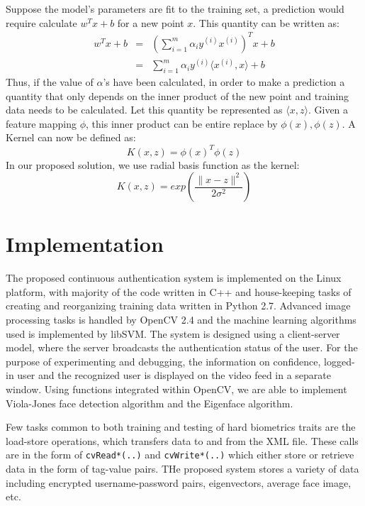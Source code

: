 \documentclass[%
        submission,
        notitlepage,
        narroweqnarray,
        inline,
        ]{ieee}
\begin{document}
Suppose the model's parameters are fit to the training set, a prediction would require calculate $w^Tx+b$ for a new point $x$. 
This quantity can be written as:
\begin{eqnarray}
w^Tx + b & = & \left( \sum_{i=1}^{m}\alpha_{i} y^{(i)} x^{(i)} \right)^Tx + b \\
         & = & \sum_{i=1}^{m} \alpha_{i}y^{(i)}\langle x^{(i)},x\rangle + b
\end{eqnarray}
Thus, if the value of $\alpha$'s have been calculated, in order to make a prediction a quantity that only depends on the inner product of the new point and training data needs to be calculated.
Let this quantity be represented as $\langle x, z\rangle$.
Given a feature mapping $\phi$, this inner product can be entire replace by $\phi(x),\phi(z)$.
A Kernel can now be defined as:
\begin{equation}
K(x,z) = \phi(x)^T\phi(z)
\end{equation}
In our proposed solution, we use radial basis function as the kernel:
\begin{equation}
K(x,z) = exp\left( \frac {\parallel x - z \parallel ^2} {2\sigma^2} \right)
\end{equation}


\section{Implementation}
The proposed continuous authentication system is implemented on the Linux platform, with majority of the code written in C++ and house-keeping tasks of creating and reorganizing training data written in Python 2.7.
Advanced image processing tasks is handled by OpenCV 2.4\cite{opencv} and the machine learning algorithms used is implemented by libSVM\cite{libsvm}.
The system is designed using a client-server model, where the server broadcasts the authentication status of the user.
For the purpose of experimenting and debugging, the information on confidence, logged-in user and the recognized user is displayed on the video feed in a separate window.
Using functions integrated within OpenCV, we are able to implement Viola-Jones face detection algorithm and the Eigenface algorithm.

Few tasks common to both training and testing of hard biometrics traits are the load-store operations, which transfers data to and from the XML file.
These calls are in the form of \verb+cvRead*(..)+ and \verb+cvWrite*(..)+ which either store or retrieve data in the form of tag-value pairs.
THe proposed system stores a variety of data including encrypted username-password pairs, eigenvectors, average face image, etc. 
\end{document}
